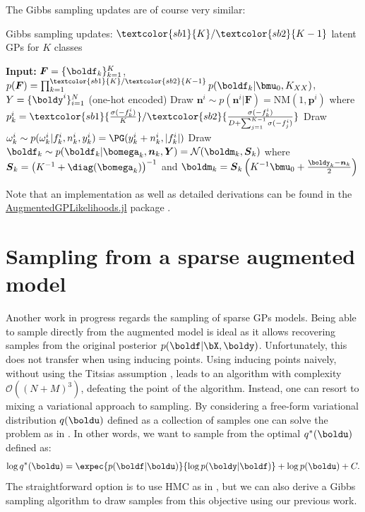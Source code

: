 The Gibbs sampling updates are of course very similar:
\begin{algorithm}[H]
    \caption{Gibbs sampling updates: $\textcolor{sb1}{K}/\textcolor{sb2}{K - 1}$ latent \ac{GPs} for $K$ classes}
    \begin{algorithmic}
    \State \textbf{Input:} $\boldsymbol{F} = \{\boldf_k\}_{k=1}^K$, $p(\boldsymbol{F}) = \prod_{k=1}^{\textcolor{sb1}{K}/\textcolor{sb2}{K - 1}} p(\boldf_k|\bmu_0, K_{XX})$, $Y=\{\boldy^i\}_{i=1}^N$ (one-hot encoded)
        \State Draw $\boldsymbol{n}^i \sim p(\boldsymbol{n}^i|\boldsymbol{F}) = \mathrm{NM}(1, \boldsymbol{p}^i)$ where 
        $p_k^i = \textcolor{sb1}{\frac{\sigma(-f_k^i)}{K}}/\textcolor{sb2}{\frac{\sigma(-f_k^i)}{D + \sum_{j=1}^{K-1} \sigma(-f_j^i)}}$
        \State Draw $\omega_k^i \sim p(\omega_k^i|f_k^i, n_k^i, y_k^i) = \PG(y_k^i + n^i_k, |f_k^i|)$
        \State Draw $\boldf_k \sim p(\boldf_k|\bomega_k,\boldsymbol{n}_k, \boldsymbol{Y}) = \mathcal{N}(\boldm_k, \boldsymbol{S}_k)$
        \State where $\boldsymbol{S}_k = \left(K^{-1} + \diag(\bomega_k)\right)^{-1}$ and $\boldm_k = \boldsymbol{S}_k\left(K^{-1}\bmu_0 + \frac{\boldy_k - \boldsymbol{n}_k}{2}\right)$
    \EndFor
    \end{algorithmic}
    \label{alg:gibbs_multiclass}
\end{algorithm}


Note that an implementation as well as detailed derivations can be found in the \href{https://github.com/JuliaGaussianProcesses/AugmentedGPLikelihoods.jl}{AugmentedGPLikelihoods.jl} package \cite{theo_galy_fajou_2022_6347022}.

\section{Sampling from a sparse augmented model}

Another work in progress regards the sampling of sparse \ac{GPs} models.
Being able to sample directly from the augmented model is ideal as it allows recovering samples from the original posterior $p(\boldf|\bX,\boldy)$.
Unfortunately, this does not transfer when using inducing points.
Using inducing points naively, without using the Titsias assumption \cite{Titsias2009}, leads to an algorithm with complexity $\mathcal{O}((N+M)^3)$, defeating the point of the algorithm.
Instead, one can resort to mixing a variational approach to sampling.
By considering a free-form variational distribution $q(\boldu)$ defined as a collection of samples one can solve the problem as in \citet{hensmanMCMCVariationallySparse2015}.
In other words, we want to sample from the optimal $q^*(\boldu)$ defined as:
\begin{align*}
    \log q^*(\boldu) = \expec{p(\boldf|\boldu)}{\log p(\boldy|\boldf)} + \log p(\boldu) + C.
\end{align*}
The straightforward option is to use \ac{HMC} as in \cite{hensmanMCMCVariationallySparse2015}, but we can also derive a Gibbs sampling algorithm to draw samples from this objective using our previous work.

